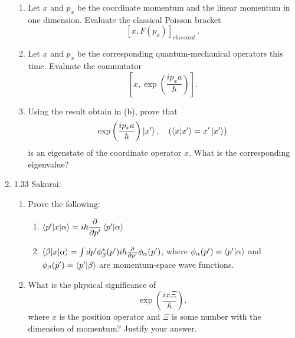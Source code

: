 \documentclass[11pt,letterpaper]{article}
\begin{document}
\begin{enumerate}
\begin{enumerate}
\item Let $x$ and $p_x$ be the coordinate momentum and the linear momentum in one dimension. Evaluate the classical Poisson bracket
$$[x, F(p_x)]_{classical}~.$$
\item Let $x$ and $p_x$ be the corresponding quantum-mechanical operators this time. Evaluate the commutator
$$\left[x, \exp{\left(\frac{ip_xa}{\hbar}\right)}\right].$$
\item Using the result obtain in (b), prove that
$$\exp{\left(\frac{ip_xa}{\hbar}\right)}\ket{x^\prime}, \quad (\braket{x|x^\prime} = x^\prime\ket{x^\prime})$$
is an eigenstate of the coordinate operator $x$. What is the corresponding eigenvalue?
\end{enumerate}
\item 1.33 Sakurai: \begin{enumerate}
\item Prove the following: \begin{enumerate}
\item $\braket{p^\prime |x|\alpha} = i\hbar\dfrac{\partial}{\partial{p^\prime}}\braket{p^\prime|\alpha}$
\item $\braket{\beta|x|\alpha}=\int{dp^\prime\phi^*_\beta(p^\prime)i\hbar\frac{\partial}{\partial{p^\prime}}\phi_\alpha(p^\prime)}$, where $\phi_\alpha(p^\prime) = \braket{p^\prime|\alpha}$ and $\phi_\beta(p^\prime) = \braket{p^\prime|\beta}$ are momentum-space wave functions.
\end{enumerate}
\item What is the physical significance of 
$$\exp{\left(\frac{ix\Xi}{\hbar}\right)},$$ where $x$ is the position operator and $\Xi$ is some number with the dimension of momentum? Justify your answer.
\end{enumerate}
\end{enumerate}
\end{document}
